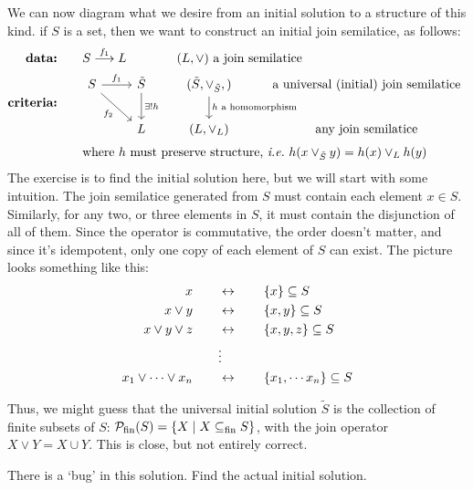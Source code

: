 We can now diagram what we desire from an initial solution to a structure of
this kind. if $S$ is a set, then we want to construct an initial join
semilatice, as follows:
\begin{align*}
    \textbf{data:}\qquad& S \overset{f_1}{\longrightarrow}L \qquad\qquad
    \text{$(L,\lor)$ a join semilatice}\\
    \textbf{criteria:}\qquad& \begin{tikzcd}[ampersand replacement=\&]
        S \arrow[r, "f_1"] \arrow[dr, swap, "f_2"] \& 
        \tilde{S}
        \arrow[d, "\exists ! h"] 
        \& (\tilde{S},\lor_{\tilde{S}},) 
        \arrow[d, "\text{$h$ a homomorphism}"] 
        \& \text{a universal (initial) join semilatice}
        \\
        {}  
        \& L \& (L,\lor_L) \& \text{any join semilatice}
    \end{tikzcd}\\
    &\text{where $h$ must preserve structure, \ie~$h(x\lor_{\tilde{S}} y) = h(x)
    \lor_L h(y)$}
\end{align*}
The exercise is to find the initial solution here, but we will start with some
intuition. The join semilatice generated from $S$ must contain each element
$x\in S$. Similarly, for any two, or three elements in $S$, it must contain the
disjunction of all of them. Since the operator is commutative, the order doesn't
matter, and since it's idempotent, only one copy of each element of $S$ can
exist. The picture looks something like this:
\begin{align*}
x  &\qquad\leftrightarrow\qquad \{ x \} \subseteq S \\
x \lor y &\qquad\leftrightarrow\qquad \{ x,y \} \subseteq S \\
x \lor y \lor z &\qquad\leftrightarrow\qquad \{ x,y,z \} \subseteq S \\
 &\qquad\vdots \\
x_1 \lor \cdots \lor x_n &\qquad\leftrightarrow\qquad \{ x_1, \cdots x_n \}
\subseteq S
\end{align*}

Thus, we might guess that the universal initial solution $\tilde{S}$ is the
collection of finite subsets of $S$:
$\mathcal{P}_{\mathrm{fin}}(S) = \{ X \mid
X \subseteq_\mathrm{fin} S \}$, with the join operator $X \lor Y = X \cup Y$.
This is close, but not entirely correct.

\begin{exercise}
There is a `bug' in this solution. Find the actual initial solution.
\end{exercise}


